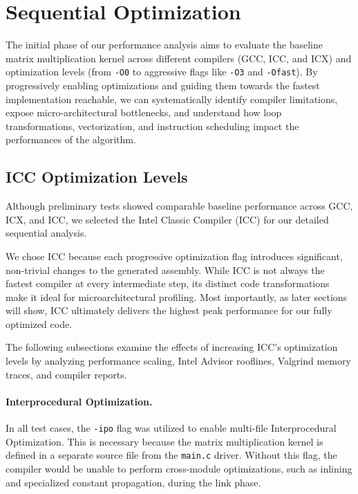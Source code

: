\section{Sequential Optimization}\label{sec:sequential}

The initial phase of our performance analysis aims to evaluate the baseline matrix multiplication kernel across different compilers (GCC, ICC, and ICX) and optimization levels (from \texttt{-O0} to aggressive flags like \texttt{-O3} and \texttt{-Ofast}). By progressively enabling optimizations and guiding them  towards the fastest implementation reachable, we can systematically identify compiler limitations, expose micro-architectural bottlenecks, and understand how loop transformations, vectorization, and instruction scheduling impact the performances of the algorithm.

\subsection{ICC Optimization Levels}

Although preliminary tests showed comparable baseline performance across GCC, ICX, and ICC, we selected the Intel Classic Compiler (ICC) for our detailed sequential analysis. 

We chose ICC because each progressive optimization flag introduces significant, non-trivial changes to the generated assembly. While ICC is not always the fastest compiler at every intermediate step, its distinct code transformations make it ideal for microarchitectural profiling. Most importantly, as later sections will show, ICC ultimately delivers the highest peak performance for our fully optimized code.

The following subsections examine the effects of increasing ICC's optimization levels by analyzing performance scaling, Intel Advisor rooflines, Valgrind memory traces, and compiler reports.


\paragraph{Interprocedural Optimization.}
In all test cases, the \texttt{-ipo} flag was utilized to enable multi-file Interprocedural Optimization. This is necessary because the matrix multiplication kernel is defined in a separate source file from the \texttt{main.c} driver. Without this flag, the compiler would be unable to perform cross-module optimizations, such as inlining and specialized constant propagation, during the link phase.


